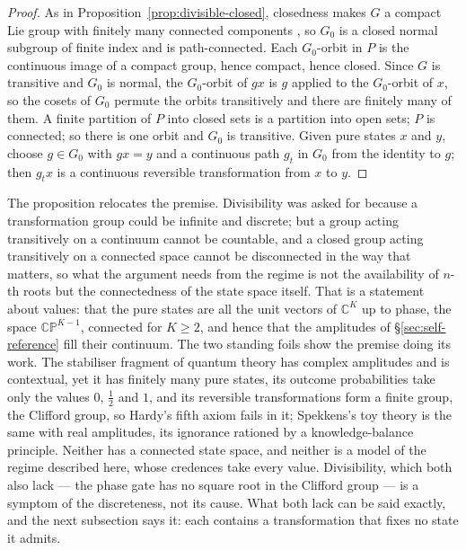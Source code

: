 \begin{proof}
As in Proposition~\ref{prop:divisible-closed}, closedness makes $G$ a compact Lie group with
finitely many connected components \autocite{broeckertomdieck1985compact}, so $G_0$ is a closed
normal subgroup of finite index and is path-connected. Each $G_0$-orbit in $P$ is the continuous
image of a compact group, hence compact, hence closed. Since $G$ is transitive and $G_0$ is
normal, the $G_0$-orbit of $gx$ is $g$ applied to the $G_0$-orbit of $x$, so the cosets of $G_0$
permute the orbits transitively and there are finitely many of them. A finite partition of $P$
into closed sets is a partition into open sets; $P$ is connected; so there is one orbit and
$G_0$ is transitive. Given pure states $x$ and $y$, choose $g \in G_0$ with $gx = y$ and a
continuous path $g_t$ in $G_0$ from the identity to $g$; then $g_t x$ is a continuous reversible
transformation from $x$ to $y$.
\end{proof}

The proposition relocates the premise. Divisibility was asked for because a transformation group
could be infinite and discrete; but a group acting transitively on a continuum cannot be
countable, and a closed group acting transitively on a connected space cannot be disconnected in
the way that matters, so what the argument needs from the regime is not the availability of
$n$-th roots but the connectedness of the state space itself. That is a statement about values:
that the pure states are all the unit vectors of $\mathbb{C}^{K}$ up to phase, the space
$\mathbb{CP}^{K-1}$, connected for $K \ge 2$, and hence that the amplitudes of
\S\ref{sec:self-reference} fill their continuum. The two standing foils show the premise doing
its work. The stabiliser fragment of quantum theory has complex amplitudes and is contextual,
yet it has finitely many pure states, its outcome probabilities take only the values $0$,
$\tfrac12$ and $1$, and its reversible transformations form a finite group, the Clifford group,
so Hardy's fifth axiom fails in it; Spekkens's toy theory \autocite{spekkens2007toy} is the same
with real amplitudes, its ignorance rationed by a knowledge-balance principle. Neither has a
connected state space, and neither is a model of the regime described here, whose credences take
every value. Divisibility, which both also lack --- the phase gate has no square root in the Clifford group
--- is a symptom of the discreteness, not its cause. What both lack can be said exactly, and the
next subsection says it: each contains a transformation that fixes no state it admits.

